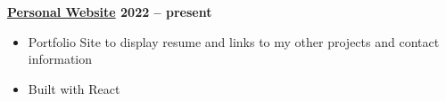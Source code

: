\textbf{\href{https://liamearle.ca/}{Personal Website} \hfill 2022 -- present} \par
\begin{itemize}
	\item Portfolio Site to display resume and links to my other projects and contact information
    \item Built with React
\end{itemize}\vspace{0.1cm}\par